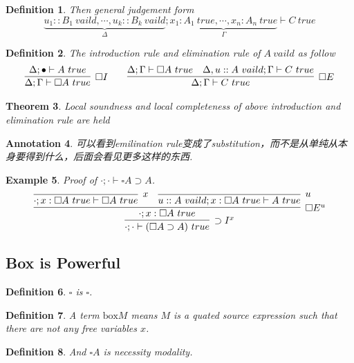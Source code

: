 \documentclass{article}
\theoremstyle{plain}
\newtheorem{theorem}{Theorem}
\newtheorem{example}[theorem]{Example}
\newtheorem{definition}[theorem]{Definition}
\newtheorem{annotation}[theorem]{Annotation}
\theoremstyle{nonumberplain}
\begin{document}
\begin{definition}
\rm Then general judgement form
$$
\underbrace{u_1::B_1~vaild,\cdots,u_k::B_k~vaild}_{\Delta}; \underbrace{x_1:A_1~true,\cdots,x_n:A_n~true}_{\Gamma} \vdash C~true
$$
\end{definition}

\begin{definition}
\rm The introduction rule and elimination rule of $A~vaild$ as follow
$$
\begin{aligned}
\infer[\square I]{\Delta; \Gamma \vdash \square A~true}{\Delta; \bullet \vdash A~true} &&&& \infer[\square E]{\Delta;\Gamma \vdash C~true}{\Delta;\Gamma \vdash \square A~true & \Delta, u::A~vaild; \Gamma \vdash C~true}
\end{aligned}
$$
\end{definition}

\begin{theorem}
\rm Local soundness and local completeness of above introduction and elimination rule are held 
\end{theorem}

\begin{annotation}
\rm 可以看到emilination rule变成了substitution，而不是从单纯从本身要得到什么，后面会看见更多这样的东西. 
\end{annotation}


\begin{example}
\rm Proof of $\cdot;\cdot\vdash \square A \supset A$.
$$
\infer[\supset I^x]{\cdot;\cdot\vdash (\square A \supset A)~true}{\infer[\square E^u]{\cdot;x:\square A~true}{\infer[x]{\cdot;x:\square A~true \vdash \square A~true}{} & \infer[u]{u::A~vaild; x:\square A~true \vdash A~true}{}  }}
$$
\end{example}



\newpage
\subsection{Box is Powerful}

\begin{definition}
\rm $\square$ is $\square$. 
\end{definition}


\begin{definition}
\rm A term $\text{box} M$ means $M$ is a quated source expression such that there are not any free variables $x$. 
\end{definition}


\begin{definition}
\rm And $\square A$ is necessity modality. 
\end{definition}
\end{document}
